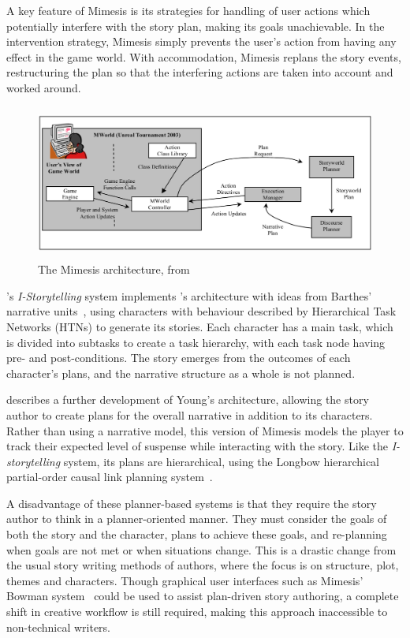 \documentclass[11pt]{report}
\begin{document}
A key feature of Mimesis is its strategies for handling of user actions which potentially
interfere with the story plan, making its goals unachievable. In the intervention strategy, Mimesis simply prevents the
user's action from having any effect in the game world. With accommodation,
Mimesis replans the story events, restructuring the plan so that the interfering
actions are taken into account and worked around.

\begin{figure}[!t]
\centerline{\includegraphics[height=2in]{mimesis.png}}
\caption{The Mimesis architecture, from \citet{young2004architecture}}\label{fig:mimesis}
\end{figure}

\citet{cavazza2002character}'s \emph{I-Storytelling} system implements
\citet{young2004architecture}'s architecture with ideas from Barthes' narrative
units~\citep{barthes1975introduction}, using characters with behaviour described
by Hierarchical Task Networks (HTNs) to generate its stories. Each character has a main task, which is divided into subtasks to create a task hierarchy, with each task node having pre- and post-conditions. The story emerges from the outcomes of each character's plans, and the narrative structure as a whole is not planned.

\citet{riedl2003managing} describes a further development of Young's architecture,
allowing the story author to create plans for the overall narrative in addition
to its characters.
Rather than using a narrative model, this version of Mimesis models the player to track their expected level of suspense while interacting with the story. Like the \emph{I-storytelling} system, its plans are hierarchical, using the Longbow hierarchical partial-order causal link planning system~\citep{young1994decomposition}.

A disadvantage of these planner-based systems is that they require the story
author to think in a planner-oriented manner. They must consider the goals of
both the story and the character, plans to achieve these goals, and re-planning
when goals are not met or when situations change. This is a drastic change from
the usual story writing methods of authors, where the focus is on structure,
plot, themes and characters. Though graphical user interfaces such as Mimesis'
Bowman system~\citep{thomas2006author} could be used to assist plan-driven
story authoring, a complete shift in creative workflow is still required, making
this approach inaccessible to non-technical writers.
\end{document}
